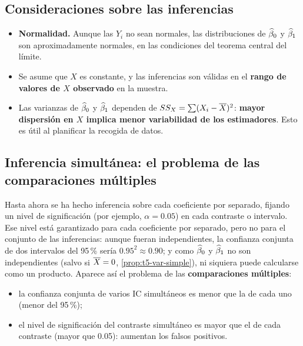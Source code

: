 \subsection{Consideraciones sobre las inferencias}

\begin{itemize}
  \item \textbf{Normalidad.} Aunque las $Y_i$ no sean normales, las distribuciones de
    $\widehat{\beta}_0$ y $\widehat{\beta}_1$ son aproximadamente normales, en las condiciones del
    teorema central del límite.
  \item Se asume que $X$ es constante, y las inferencias son válidas en el \textbf{rango de
    valores de $X$ observado} en la muestra.
  \item Las varianzas de $\widehat{\beta}_0$ y $\widehat{\beta}_1$ dependen de $SS_X=\sum(X_i-\overline{X})^2$:
    \textbf{mayor dispersión en $X$ implica menor variabilidad de los estimadores}. Esto es útil
    al planificar la recogida de datos.
\end{itemize}

\subsection{Inferencia simultánea: el problema de las comparaciones múltiples}
\label{sec:t3-bonferroni}

Hasta ahora se ha hecho inferencia sobre cada coeficiente por separado, fijando un nivel de
significación (por ejemplo, $\alpha=0.05$) en cada contraste o intervalo. Ese nivel está
garantizado para cada coeficiente por separado, pero no para el conjunto de las inferencias:
aunque fueran independientes, la confianza conjunta de dos intervalos del 95\,\% sería
$0.95^2\approx0.90$; y como $\widehat{\beta}_0$ y $\widehat{\beta}_1$ no son independientes (salvo si
$\overline{X}=0$, \cref{prop:t5-var-simple}), ni siquiera puede calcularse como un producto.
Aparece así el problema de las \textbf{comparaciones múltiples}:
\begin{itemize}
  \item la confianza conjunta de varios IC simultáneos es menor que la de cada uno (menor del
    95\,\%);
  \item el nivel de significación del contraste simultáneo es mayor que el de cada contraste
    (mayor que 0.05): aumentan los falsos positivos.
\end{itemize}

